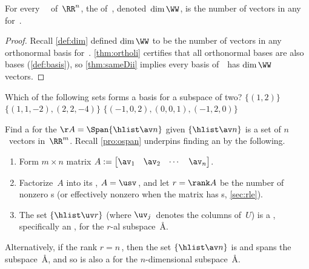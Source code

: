 \begin{theorem} \label{thm:dimii} 
For every ~\WW\ of~\(\RR^n\),  
the  of~\WW, denoted~\(\dim\WW\), is the number of vectors in any  for~\WW. 
\end{theorem}

\begin{proof} 
Recall \cref{def:dim} defined \(\dim\WW\) to be the number of vectors in any orthonormal basis for~\WW.
\cref{thm:ortholi} certifies that all orthonormal bases are also bases (\cref{def:basis}), so \cref{thm:sameDii} implies every basis of~\WW\ has \(\dim\WW\) vectors.
\end{proof}




\begin{activity}
Which of the following sets forms a basis for a subspace of  two?
{\(\{(1,2)\}\)}
{\(\{(1,1,-2),(2,2,-4)\}\)}
{\(\{(-1,0,2),(0,0,1),(-1,2,0)\}\)}
\end{activity}





\begin{procedure} \label{pro:bfs}
Find a  for the  \(\AA=\Span\{\hlist\av n\}\) given $\{\hlist\av n\}$ is a set of $n$~vectors in~\(\RR^m\).
Recall \cref{pro:ospan} underpins finding an  by the following.
\begin{enumerate}
\item Form \(m\times n\) matrix $A:= \begin{bmatrix} \av_1 & \av_2& \cdots&\av_n \end{bmatrix}$. 
\item Factorize~\(A\) into its \svd, $A=\usv$\,, and let \(r=\rank A\) be the number of nonzero s (or effectively nonzero when the matrix has s, \cref{sec:rle}).
\item The set \(\{\hlist\uv r\}\)  (where \(\uv_j\)~denotes the columns of~$U$) is a , specifically an , for the \(r\)-al subspace~\AA.
\end{enumerate}
Alternatively, if the rank \(r=n\)\,, then the set \(\{\hlist\av n\}\) is  and spans the subspace~\AA, and so is also a  for the \(n\)-dimensional subspace~\AA.
\end{procedure}



